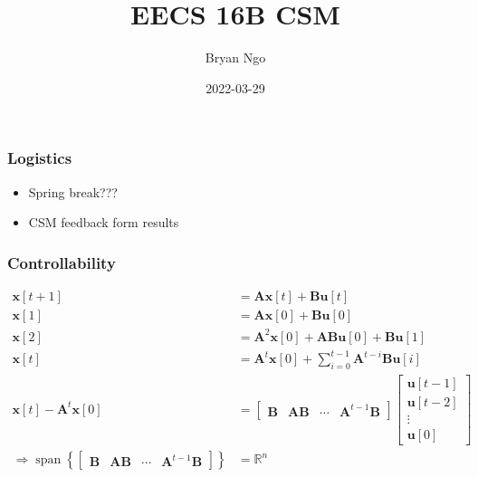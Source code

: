 \documentclass[aspectratio=169]{beamer}
\title{EECS 16B CSM}
\author{Bryan Ngo}
\date{2022-03-29}
\institute{UC Berkeley}
\newcommand{\R}{\mathbb{R}}
\begin{document}
\begin{frame}
    \maketitle
\end{frame}

\begin{frame}
    \frametitle{Logistics}

    \begin{itemize}
        \item Spring break???
        \item CSM feedback form results
    \end{itemize}
\end{frame}

\begin{frame}
    \frametitle{Controllability}

    \begin{align}
        \bm{x}[t + 1] &= \bm{Ax}[t] + \bm{Bu}[t] \\
        \bm{x}[1] &= \bm{Ax}[0] + \bm{Bu}[0] \\
        \bm{x}[2] &= \bm{A}^2 \bm{x}[0] + \bm{ABu}[0] + \bm{Bu}[1] \\
        \bm{x}[t] &= \bm{A}^t \bm{x}[0] + \sum_{i = 0}^{t - 1} \bm{A}^{t - i} \bm{Bu}[i] \\
        \bm{x}[t] - \bm{A}^t \bm{x}[0] &=
        \begin{bmatrix}
            \bm{B} & \bm{AB} & \cdots & \bm{A}^{t - 1} \bm{B}
        \end{bmatrix}
        \begin{bmatrix}
            \bm{u}[t - 1] \\
            \bm{u}[t - 2] \\ 
            \vdots \\
            \bm{u}[0]
        \end{bmatrix} \\
        \Rightarrow \operatorname{span}\left\{
        \begin{bmatrix}
            \bm{B} & \bm{AB} & \cdots & \bm{A}^{t - 1} \bm{B}
        \end{bmatrix}\right\} &= \R^n
    \end{align}
\end{frame}
\end{document}
